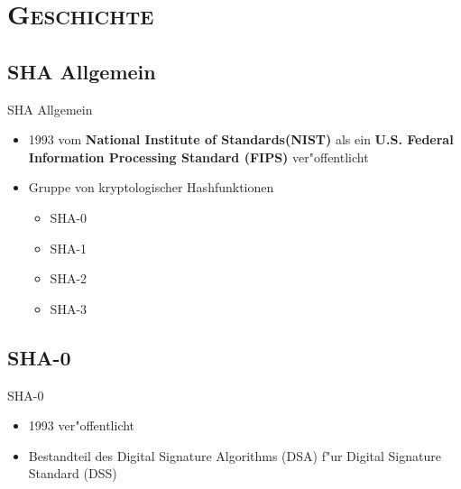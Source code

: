 \documentclass[xcolor=x11names,compress]{beamer}
\renewcommand{\(}{\begin{columns}}
\renewcommand{\)}{\end{columns}}
\newcommand{\<}[1]{\begin{column}{#1}}
\renewcommand{\>}{\end{column}}
\begin{document}
\section{\scshape Geschichte}
\subsection{SHA Allgemein}
\begin{frame}{SHA Allgemein}
\begin{itemize}


\item 1993 vom {\bf National Institute of Standards(NIST)} 
als ein {\bf U.S. Federal Information Processing Standard (FIPS)} 
ver"offentlicht

	\pause
\item Gruppe von kryptologischer Hashfunktionen
	\begin{itemize}
		\item SHA-0	
		\item SHA-1
		\item SHA-2
		\item SHA-3
	\end{itemize}

\end{itemize}
\end{frame}

\subsection{SHA-0}
\begin{frame}{SHA-0}
\begin{itemize}
\item 1993 ver"offentlicht
	\pause
\item Bestandteil des Digital Signature Algorithms (DSA) f"ur Digital Signature Standard (DSS) %

\end{itemize}
\end{frame}

\end{document}
